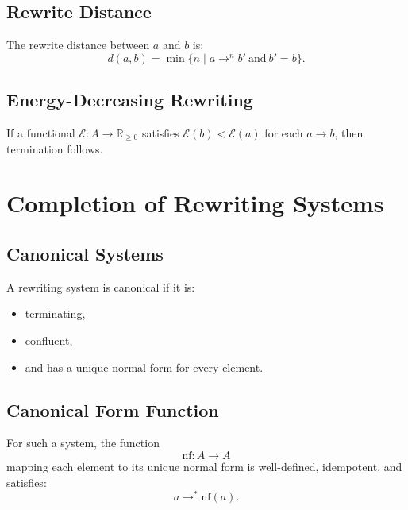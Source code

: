 \subsection{Rewrite Distance}

The rewrite distance between $a$ and $b$ is:
\[
d(a,b) =
\min\{ n \mid a \to^n b' \ \text{and}\ b' = b \}.
\]

\subsection{Energy-Decreasing Rewriting}

If a functional $\mathcal{E}:A\to\mathbb{R}_{\ge 0}$ satisfies  
$\mathcal{E}(b) < \mathcal{E}(a)$ for each $a\to b$,  
then termination follows.

\section{Completion of Rewriting Systems}

\subsection{Canonical Systems}

A rewriting system is canonical if it is:
\begin{itemize}
\item terminating,
\item confluent,
\item and has a unique normal form for every element.
\end{itemize}

\subsection{Canonical Form Function}

For such a system, the function
\[
\mathrm{nf} : A \to A
\]
mapping each element to its unique normal form is well-defined, idempotent, and satisfies:
\[
a \to^\ast \mathrm{nf}(a).
\]


